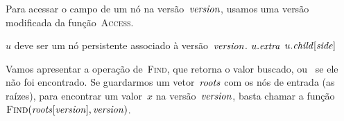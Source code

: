 \documentclass[../../main.tex]{subfiles}
\begin{document}
Para acessar o campo de um nó na versão~$\mathit{version}$, usamos uma versão modificada da função~\textsc{Access}.


\begin{algorithm}
\begin{algorithmic}[1]

\Require $u$ deve ser um nó persistente associado à versão~$\mathit{version}$.
		\State \Return $u.\mathit{extra}$
	\EndIf
	\State \Return $u.\mathit{child}[\mathit{side}]$
\EndFunction

\end{algorithmic}
\end{algorithm}

Vamos apresentar a operação de~\textsc{Find}, que retorna o valor buscado, ou~ se ele não foi encontrado. Se guardarmos um vetor~$\mathit{roots}$ com os nós de entrada (as raízes), para encontrar um valor~$x$ na versão~$\mathit{version}$, basta chamar a função~$\Call{Find}{\roots[\version], \version}$.
\end{document}
